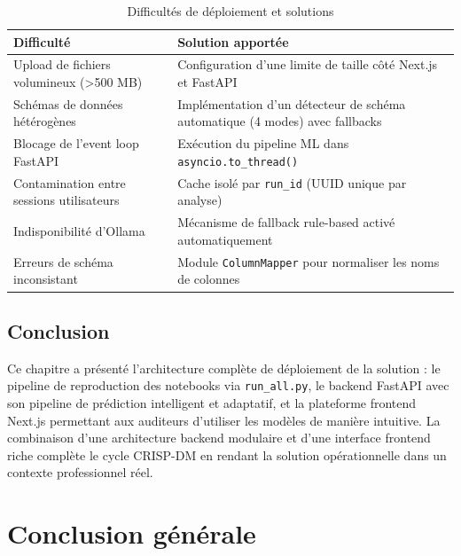 \documentclass[12pt,a4paper,twoside]{report}
\begin{document}
\begin{table}[H]
\centering
\caption{Difficultés de déploiement et solutions}
\label{tab:difficultes}
\begin{tabular}{p{4.5cm}p{9cm}}
\toprule
\textbf{Difficulté}                        & \textbf{Solution apportée} \\
\midrule
Upload de fichiers volumineux (>500 MB)    & Configuration d'une limite de taille côté Next.js et FastAPI \\
Schémas de données hétérogènes            & Implémentation d'un détecteur de schéma automatique (4 modes) avec fallbacks \\
Blocage de l'event loop FastAPI            & Exécution du pipeline ML dans \texttt{asyncio.to\_thread()} \\
Contamination entre sessions utilisateurs & Cache isolé par \texttt{run\_id} (UUID unique par analyse) \\
Indisponibilité d'Ollama                  & Mécanisme de fallback rule-based activé automatiquement \\
Erreurs de schéma inconsistant            & Module \texttt{ColumnMapper} pour normaliser les noms de colonnes \\
\bottomrule
\end{tabular}
\end{table}

\section*{Conclusion}

Ce chapitre a présenté l'architecture complète de déploiement de la solution : le pipeline de reproduction des notebooks via \texttt{run\_all.py}, le backend FastAPI avec son pipeline de prédiction intelligent et adaptatif, et la plateforme frontend Next.js permettant aux auditeurs d'utiliser les modèles de manière intuitive. La combinaison d'une architecture backend modulaire et d'une interface frontend riche complète le cycle CRISP-DM en rendant la solution opérationnelle dans un contexte professionnel réel.

\chapter*{Conclusion générale}
\end{document}
